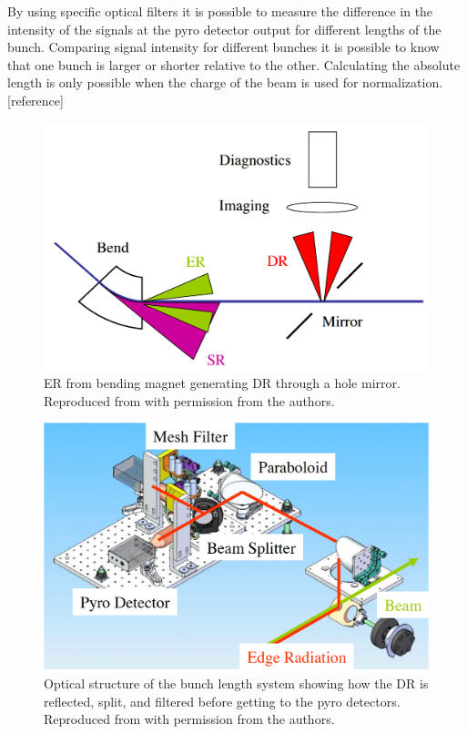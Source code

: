 \documentclass[letter,
        biblatex,   %
        keeplastbox,  %
        ]{jacow}
\begin{document}
By using specific optical filters it is possible to measure the difference in the intensity of the signals at the pyro detector output for different lengths of the bunch. Comparing signal intensity for different bunches it is possible to know that one bunch is larger or shorter relative to the other. Calculating the absolute length is only possible when the charge of the beam is used for normalization. [reference]

\begin{figure}[!htb]
  \centering
  \includegraphics*[width=\columnwidth]{BunchLengthStruct_1}
  \caption{ER from bending magnet generating DR through a hole mirror. Reproduced from \cite{blen-pac07} with permission from the authors.}
  \label{fig:blen_struct1}
\end{figure}

\begin{figure}[!htb]
  \centering
  \includegraphics*[width=\columnwidth]{BunchLengthStruct_2}
  \caption{Optical structure of the bunch length system showing how the DR is reflected, split, and filtered before getting to the pyro detectors. Reproduced from \cite{blen-pac07} with permission from the authors.}
  \label{fig:blen_struct2}
\end{figure}
\end{document}
